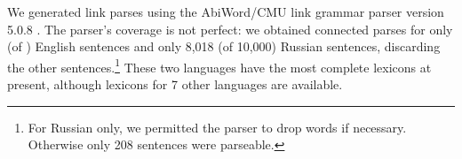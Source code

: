 \documentclass[11pt]{article}
\newcommand{\Note}[4][]{\todo[author=#2,color=#3,fancyline,#1]{#4}}
\newcommand{\noteJH}[2][]{\Note[#1]{JH}{blue!40}{#2}}
\newcommand{\noteJE}[2][]{\Note[#1]{JE}{green!40}{#2}}
\newcommand{\NoteJE}[2][]{\noteJE[inline,#1]{#2}}
\begin{document}
We generated link parses using the AbiWord/CMU link grammar parser version 5.0.8 \cite{LINKPARSER-2014}.  The parser's coverage is not perfect: we obtained connected parses for only (of $\!\!$) English sentences and only 8,018 (of 10,000) Russian sentences, discarding the other sentences.\footnote{For Russian only, we permitted the parser to drop words if necessary.  Otherwise only 208 sentences were parseable.}
These two languages have the most complete lexicons at present, although lexicons for 7 other languages are available.  






%  

\end{document}
